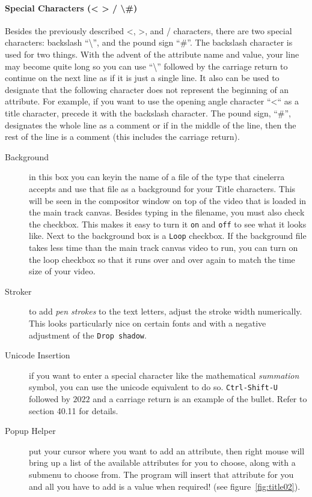 \paragraph{Special Characters (< > / \textbackslash \#)} Besides the previously described <, >, and / characters, there are two special characters: backslash “\textbackslash”, and the pound sign “\#”. The backslash character is used for two things. With the advent of the attribute name and value, your line may become quite long so you can use “\textbackslash” followed by the carriage return to continue on the next line as if it is just a single line. It also can be used to designate that the following character does not represent the beginning of an attribute. For example, if you want to use the opening angle character “<“ as a title character, precede it with the backslash character. The pound sign, “\#”, designates the whole line as a comment or if in the middle of the line, then the rest of the line is a comment (this includes the carriage return).

\begin{description}
    \item[Background] in this box you can keyin the name of a file of the type that cinelerra accepts and use that file as a background for your Title characters. This will be seen in the compositor window on top of the video that is loaded in the main track canvas. Besides typing in the filename, you must also check the checkbox. This makes it easy to turn it \texttt{on} and \texttt{off} to see what it looks like. Next to the background box is a \texttt{Loop} checkbox. If the background file takes less time than the main track canvas video to run, you can turn on the loop checkbox so that it runs over and over again to match the time size of your video.
    \item[Stroker] to add \textit{pen strokes} to the text letters, adjust the stroke width numerically. This looks particularly nice on certain fonts and with a negative adjustment of the \texttt{Drop shadow}.
    \item[Unicode Insertion] if you want to enter a special character like the mathematical \textit{summation} symbol, you can use the unicode equivalent to do so. \texttt{Ctrl-Shift-U} followed by $2022$ and a carriage return is an example of the bullet. Refer to section 40.11 for details.
    \item[Popup Helper] put your cursor where you want to add an attribute, then right mouse will bring up a list of the available attributes for you to choose, along with a submenu to choose from. The program will insert that attribute for you and all you have to add is a value when required! (see figure~\ref{fig:title02}).
\end{description}


